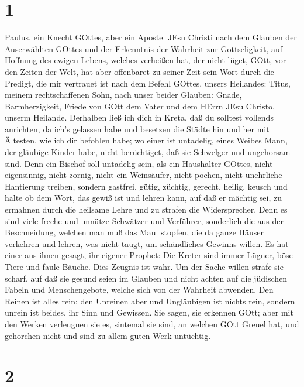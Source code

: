 \hypertarget{section}{%
\section{1}\label{section}}

 Paulus, ein Knecht GOttes, aber ein Apostel JEsu Christi
nach dem Glauben der Auserwählten GOttes und der Erkenntnis der Wahrheit
zur Gottseligkeit,  auf Hoffnung des ewigen Lebens, welches
verheißen hat, der nicht lüget, GOtt, vor den Zeiten der Welt,
 hat aber offenbaret zu seiner Zeit sein Wort durch die
Predigt, die mir vertrauet ist nach dem Befehl GOttes, unsers Heilandes:
 Titus, meinem rechtschaffenen Sohn, nach unser beider
Glauben: Gnade, Barmherzigkeit, Friede von GOtt dem Vater und dem HErrn
JEsu Christo, unserm Heilande.  Derhalben ließ ich dich in
Kreta, daß du solltest vollends anrichten, da ich's gelassen habe und
besetzen die Städte hin und her mit Ältesten, wie ich dir befohlen habe;
 wo einer ist untadelig, eines Weibes Mann, der gläubige
Kinder habe, nicht berüchtiget, daß sie Schwelger und ungehorsam sind.
 Denn ein Bischof soll untadelig sein, als ein Haushalter
GOttes, nicht eigensinnig, nicht zornig, nicht ein Weinsäufer, nicht
pochen, nicht unehrliche Hantierung treiben,  sondern
gastfrei, gütig, züchtig, gerecht, heilig, keusch  und halte
ob dem Wort, das gewiß ist und lehren kann, auf daß er mächtig sei, zu
ermahnen durch die heilsame Lehre und zu strafen die Widersprecher.
 Denn es sind viele freche und unnütze Schwätzer und
Verführer, sonderlich die aus der Beschneidung,  welchen
man muß das Maul stopfen, die da ganze Häuser verkehren und lehren, was
nicht taugt, um schändliches Gewinns willen.  Es hat einer
aus ihnen gesagt, ihr eigener Prophet: Die Kreter sind immer Lügner,
böse Tiere und faule Bäuche.  Dies Zeugnis ist wahr. Um der
Sache willen strafe sie scharf, auf daß sie gesund seien im Glauben
 und nicht achten auf die jüdischen Fabeln und
Menschengebote, welche sich von der Wahrheit abwenden.  Den
Reinen ist alles rein; den Unreinen aber und Ungläubigen ist nichts
rein, sondern unrein ist beides, ihr Sinn und Gewissen. 
Sie sagen, sie erkennen GOtt; aber mit den Werken verleugnen sie es,
sintemal sie sind, an welchen GOtt Greuel hat, und gehorchen nicht und
sind zu allem guten Werk untüchtig.

\hypertarget{section-1}{%
\section{2}\label{section-1}}

